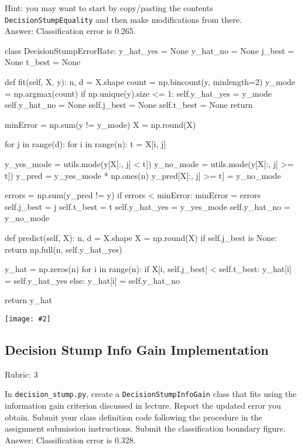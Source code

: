 \documentclass{article}
\newcommand{\ans}[1]{\green{Answer: #1}}
\newcommand{\rubric}[1]{\green{Rubric: #1}}
\newcommand{\blue}[1]{{\color{blue}#1}}
\newcommand{\green}[1]{{\color{green}#1}}
\newcommand{\centerfig}[2]{\begin{center}\texttt{[image: \#2]}\end{center}}
\begin{document}
    Hint: you may want to start by copy/pasting the contents \texttt{DecisionStumpEquality} and then make modifications from there.\\
    \ans{Classification error is 0.265.}

    \begin{python}
class DecisionStumpErrorRate:
    y_hat_yes = None
    y_hat_no = None
    j_best = None
    t_best = None

    def fit(self, X, y):
        n, d = X.shape
        count = np.bincount(y, minlength=2)
        y_mode = np.argmax(count)
        if np.unique(y).size <= 1:
            self.y_hat_yes = y_mode
            self.y_hat_no = None
            self.j_best = None
            self.t_best = None
            return

        minError = np.sum(y != y_mode)
        X = np.round(X)

        for j in range(d):
            for i in range(n):
                t = X[i, j]

                y_yes_mode = utils.mode(y[X[:, j] < t])
                y_no_mode = utils.mode(y[X[:, j] >= t])
                y_pred = y_yes_mode * np.ones(n)
                y_pred[X[:, j] >= t] = y_no_mode

                errors = np.sum(y_pred != y)
                if errors < minError:
                    minError = errors
                    self.j_best = j
                    self.t_best = t
                    self.y_hat_yes = y_yes_mode
                    self.y_hat_no = y_no_mode

    def predict(self, X):
        n, d = X.shape
        X = np.round(X)
        if self.j_best is None:
            return np.full(n, self.y_hat_yes)

        y_hat = np.zeros(n)
        for i in range(n):
            if X[i, self.j_best] < self.t_best:
                y_hat[i] = self.y_hat_yes
            else:
                y_hat[i] = self.y_hat_no

        return y_hat
    \end{python}

    \centerfig{0.7}{../figs/q6_2_decisionBoundary}


    \subsection{Decision Stump Info Gain Implementation}
    \rubric{3}

    In \texttt{decision\string_stump.py}, \blue{create a \texttt{DecisionStumpInfoGain} class that
        fits using the information gain criterion discussed in lecture.
        Report the updated error you obtain.
        Submit your class definition code following the procedure in the assignment submission instructions.
        Submit the classification boundary figure.}\\
    \ans{Classification error is 0.328.}
\end{document}
